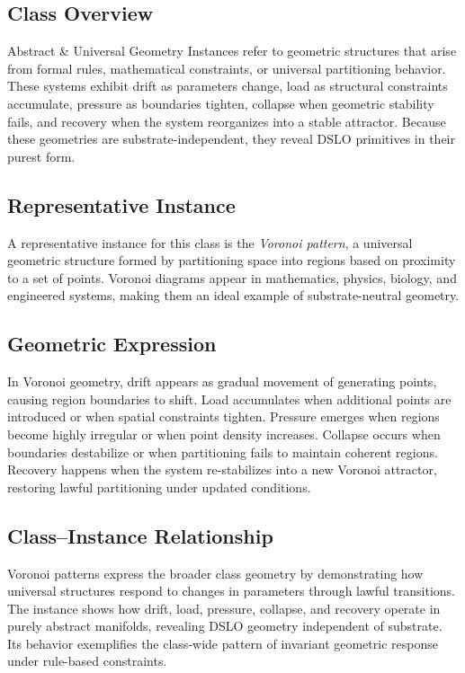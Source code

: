 \subsection{Class Overview}
Abstract \& Universal Geometry Instances refer to geometric structures that arise from formal rules, 
mathematical constraints, or universal partitioning behavior. These systems exhibit drift as parameters 
change, load as structural constraints accumulate, pressure as boundaries tighten, collapse when 
geometric stability fails, and recovery when the system reorganizes into a stable attractor. Because 
these geometries are substrate-independent, they reveal DSLO primitives in their purest form.

\subsection{Representative Instance}
A representative instance for this class is the \emph{Voronoi pattern}, a universal geometric structure 
formed by partitioning space into regions based on proximity to a set of points. Voronoi diagrams appear 
in mathematics, physics, biology, and engineered systems, making them an ideal example of substrate-neutral 
geometry.

\subsection{Geometric Expression}
In Voronoi geometry, drift appears as gradual movement of generating points, causing region boundaries 
to shift. Load accumulates when additional points are introduced or when spatial constraints tighten. 
Pressure emerges when regions become highly irregular or when point density increases. Collapse occurs 
when boundaries destabilize or when partitioning fails to maintain coherent regions. Recovery happens 
when the system re-stabilizes into a new Voronoi attractor, restoring lawful partitioning under updated 
conditions.

\subsection{Class--Instance Relationship}
Voronoi patterns express the broader class geometry by demonstrating how universal structures respond to 
changes in parameters through lawful transitions. The instance shows how drift, load, pressure, collapse, 
and recovery operate in purely abstract manifolds, revealing DSLO geometry independent of substrate. 
Its behavior exemplifies the class-wide pattern of invariant geometric response under rule-based 
constraints.

